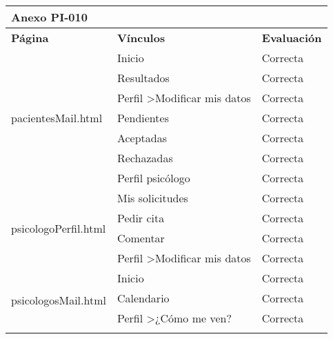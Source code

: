 \begin{table}[htpb]
\centering
\begin{tabularx}{\textwidth}{|l|l|X|}
\hline
\multicolumn{3}{|l|}{\textbf{Anexo PI-010}}                                                                \\ \hline
\textbf{Página}                           & \textbf{Vínculos}                       & \textbf{Evaluación} \\ \hline
\multirow{7}{*}{pacientesMail.html}       & Inicio                                  & Correcta            \\ \cline{2-3} 
                                          & Resultados                              & Correcta            \\ \cline{2-3} 
                                          & Perfil \textgreater Modificar mis datos & Correcta            \\ \cline{2-3} 
                                          & Pendientes                              & Correcta            \\ \cline{2-3} 
                                          & Aceptadas                               & Correcta            \\ \cline{2-3} 
                                          & Rechazadas                              & Correcta            \\ \cline{2-3} 
                                          & Perfil psicólogo                        & Correcta            \\ \hline
\multirow{4}{*}{psicologoPerfil.html}     & Mis solicitudes                         & Correcta            \\ \cline{2-3} 
                                          & Pedir cita                              & Correcta            \\ \cline{2-3} 
                                          & Comentar                                & Correcta            \\ \cline{2-3} 
                                          & Perfil \textgreater Modificar mis datos & Correcta            \\ \hline
\multirow{9}{*}{psicologosMail.html}      & Inicio                                  & Correcta            \\ \cline{2-3} 
                                          & Calendario                              & Correcta            \\ \cline{2-3} 
                                          & Perfil \textgreater¿Cómo me ven?        & Correcta            \\ \cline{2-3} 

\end{tabularx}
\end{table}
